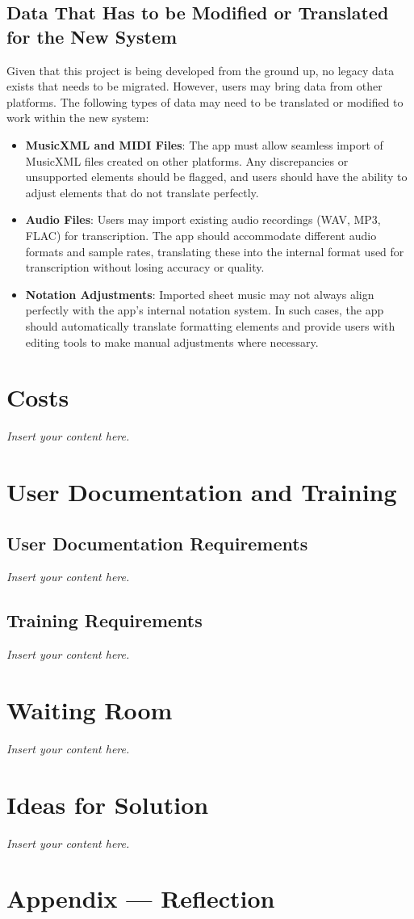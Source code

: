 \documentclass[12pt]{article}
\newcommand{\lips}{\textit{Insert your content here.}}
\begin{document}
\subsection{Data That Has to be Modified or Translated for the New System}
Given that this project is being developed from the ground up, no legacy data exists that needs to be migrated. However, users may bring data from other platforms. The following types of data may need to be translated or modified to work within the new system:
\begin{itemize}
    \item \textbf{MusicXML and MIDI Files}: The app must allow seamless import of MusicXML files created on other platforms. Any discrepancies or unsupported elements should be flagged, and users should have the ability to adjust elements that do not translate perfectly.
    
    \item \textbf{Audio Files}: Users may import existing audio recordings (WAV, MP3, FLAC) for transcription. The app should accommodate different audio formats and sample rates, translating these into the internal format used for transcription without losing accuracy or quality.
    
    \item \textbf{Notation Adjustments}: Imported sheet music may not always align perfectly with the app’s internal notation system. In such cases, the app should automatically translate formatting elements and provide users with editing tools to make manual adjustments where necessary.
\end{itemize}

\section{Costs}
\lips
\section{User Documentation and Training}
\subsection{User Documentation Requirements}
\lips
\subsection{Training Requirements}
\lips

\section{Waiting Room}

\lips

\section{Ideas for Solution}
\lips

\newpage{}



\newpage{}
\section*{Appendix --- Reflection}




\end{document}
